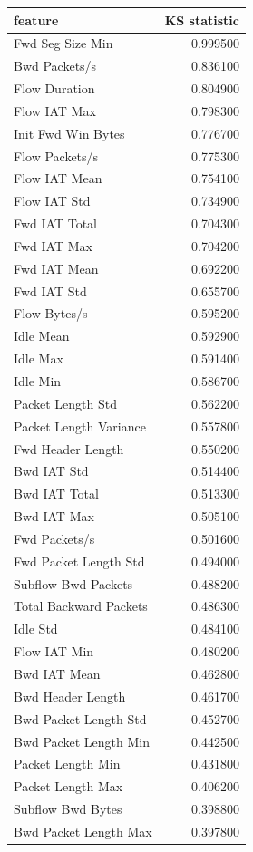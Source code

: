 \begin{tabular}{lr}
\toprule
feature & KS statistic \\
\midrule
Fwd Seg Size Min & 0.999500 \\
Bwd Packets/s & 0.836100 \\
Flow Duration & 0.804900 \\
Flow IAT Max & 0.798300 \\
Init Fwd Win Bytes & 0.776700 \\
Flow Packets/s & 0.775300 \\
Flow IAT Mean & 0.754100 \\
Flow IAT Std & 0.734900 \\
Fwd IAT Total & 0.704300 \\
Fwd IAT Max & 0.704200 \\
Fwd IAT Mean & 0.692200 \\
Fwd IAT Std & 0.655700 \\
Flow Bytes/s & 0.595200 \\
Idle Mean & 0.592900 \\
Idle Max & 0.591400 \\
Idle Min & 0.586700 \\
Packet Length Std & 0.562200 \\
Packet Length Variance & 0.557800 \\
Fwd Header Length & 0.550200 \\
Bwd IAT Std & 0.514400 \\
Bwd IAT Total & 0.513300 \\
Bwd IAT Max & 0.505100 \\
Fwd Packets/s & 0.501600 \\
Fwd Packet Length Std & 0.494000 \\
Subflow Bwd Packets & 0.488200 \\
Total Backward Packets & 0.486300 \\
Idle Std & 0.484100 \\
Flow IAT Min & 0.480200 \\
Bwd IAT Mean & 0.462800 \\
Bwd Header Length & 0.461700 \\
Bwd Packet Length Std & 0.452700 \\
Bwd Packet Length Min & 0.442500 \\
Packet Length Min & 0.431800 \\
Packet Length Max & 0.406200 \\
Subflow Bwd Bytes & 0.398800 \\
Bwd Packet Length Max & 0.397800 \\

\end{tabular}
